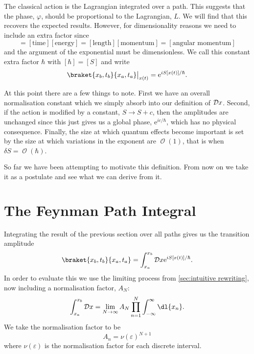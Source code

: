 \documentclass[fleqn]{NotesClass}
\newcommand*{\e}{\mathrm{e}}
\newcommand*{\order}{\mathop{\mathcal{O}}}
\newcommand*{\lagrangian}{L}
\begin{document}
    The classical action is the Lagrangian integrated over a path.
    This suggests that the phase, \(\varphi\), should be proportional to the Lagrangian, \(\lagrangian\).
    We will find that this recovers the expected results.
    However, for dimensionality reasons we need to include an extra factor since
    \begin{equation}
        [S] = [\text{time}][\text{energy}] = [\text{length}][\text{momentum}] = [\text{angular momentum}]
    \end{equation}
    and the argument of the exponential must be dimensionless.
    We call this constant extra factor \(\hbar\) with \([\hbar] = [S]\) and write
    \begin{equation}
        \braket{x_b, t_b}{x_a, t_a}\big\vert_{x(t)} = \e^{iS[x(t)]/\hbar}.
    \end{equation}
    
    At this point there are a few things to note.
    First we have an overall normalisation constant which we simply absorb into our definition of \(\DL{x}\).
    Second, if the action is modified by a constant, \(S \to S + c\), then the amplitudes are unchanged since this just gives us a global phase, \(\e^{ic/\hbar}\), which has no physical consequence.
    Finally, the size at which quantum effects become important is set by the size at which variations in the exponent are \(\order(1)\), that is when \(\delta S = \order(\hbar)\).
    
    So far we have been attempting to motivate this definition.
    From now on we take it as a postulate and see what we can derive from it.
    
    \section{The Feynman Path Integral}
    Integrating the result of the previous section over all paths gives us the transition amplitude
    \begin{equation}
        \braket{x_b, t_b}{x_a, t_a} = \int_{x_a}^{x_b} \DL{x} \e^{iS[x(t)]/\hbar}.
    \end{equation}
    In order to evaluate this we use the limiting process from \cref{sec:intuitive rewriting}, now including a normalisation factor, \(A_N\):
    \begin{equation}
        \int_{x_a}^{x_b}\DL{x} = \lim_{N\to\infty} A_N \prod_{n=1}^{N}\int_{-\infty}^{\infty} \dl{x_n}.
    \end{equation}
    We take the normalisation factor to be
    \begin{equation}
        A_n = \nu(\varepsilon)^{N+1}
    \end{equation}
    where \(\nu(\varepsilon)\) is the normalisation factor for each discrete interval.
    
\end{document}
